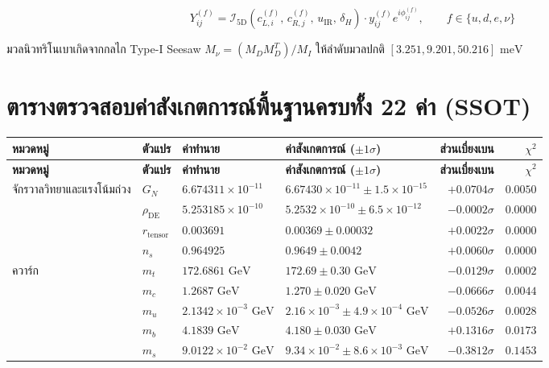 \documentclass[11pt, a4paper]{article}
\begin{document}
\begin{equation}
Y_{ij}^{(f)} = \mathcal{I}_{5\text{D}}\!\left(c_{L,i}^{(f)},\, c_{R,j}^{(f)},\, u_{\text{IR}},\, \delta_H\right) \cdot y_{ij}^{(f)} e^{i\phi_{ij}^{(f)}}, \qquad f \in \{u, d, e, \nu\}
\end{equation}

มวลนิวทริโนเบาเกิดจากกลไก Type-I Seesaw $M_\nu = (M_D M_D^T)/M_I$ ให้ลำดับมวลปกติ $[3.251, 9.201, 50.216]\text{ meV}$

\section{ตารางตรวจสอบค่าสังเกตการณ์พื้นฐานครบทั้ง 22 ค่า (SSOT)}

{\small
\setlength{\tabcolsep}{4pt}
\begin{longtable}{p{2.7cm} l l p{4.1cm} r r}
\toprule
\textbf{หมวดหมู่} & \textbf{ตัวแปร} & \textbf{ค่าทำนาย} & \textbf{ค่าสังเกตการณ์ ($\pm 1\sigma$)} & \textbf{ส่วนเบี่ยงเบน} & \textbf{$\chi^2$} \\
\midrule
\endfirsthead
\toprule
\textbf{หมวดหมู่} & \textbf{ตัวแปร} & \textbf{ค่าทำนาย} & \textbf{ค่าสังเกตการณ์ ($\pm 1\sigma$)} & \textbf{ส่วนเบี่ยงเบน} & \textbf{$\chi^2$} \\
\midrule
\endhead
\bottomrule
\endfoot
จักรวาลวิทยาและแรงโน้มถ่วง & $G_N$ & $6.674311 \times 10^{-11}$ & $6.67430 \times 10^{-11} \pm 1.5 \times 10^{-15}$ & $+0.0704\sigma$ & $0.0050$ \\
 & $\rho_{\text{DE}}$ & $5.253185 \times 10^{-10}$ & $5.2532 \times 10^{-10} \pm 6.5 \times 10^{-12}$ & $-0.0002\sigma$ & $0.0000$ \\
 & $r_{\text{tensor}}$ & $0.003691$ & $0.00369 \pm 0.00032$ & $+0.0022\sigma$ & $0.0000$ \\
 & $n_s$ & $0.964925$ & $0.9649 \pm 0.0042$ & $+0.0060\sigma$ & $0.0000$ \\
\midrule
ควาร์ก & $m_t$ & $172.6861\text{ GeV}$ & $172.69 \pm 0.30\text{ GeV}$ & $-0.0129\sigma$ & $0.0002$ \\
 & $m_c$ & $1.2687\text{ GeV}$ & $1.270 \pm 0.020\text{ GeV}$ & $-0.0666\sigma$ & $0.0044$ \\
 & $m_u$ & $2.1342 \times 10^{-3}\text{ GeV}$ & $2.16 \times 10^{-3} \pm 4.9 \times 10^{-4}\text{ GeV}$ & $-0.0526\sigma$ & $0.0028$ \\
 & $m_b$ & $4.1839\text{ GeV}$ & $4.180 \pm 0.030\text{ GeV}$ & $+0.1316\sigma$ & $0.0173$ \\
 & $m_s$ & $9.0122 \times 10^{-2}\text{ GeV}$ & $9.34 \times 10^{-2} \pm 8.6 \times 10^{-3}\text{ GeV}$ & $-0.3812\sigma$ & $0.1453$ \\

\end{longtable}}
\end{document}

